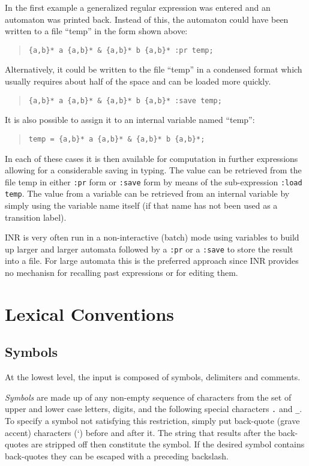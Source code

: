 In the first example a generalized regular expression was entered and an
automaton was printed back.
Instead of this, the automaton could have been written to a file ``temp''
in the form shown above:
\begin{quote}
\begin{verbatim}
{a,b}* a {a,b}* & {a,b}* b {a,b}* :pr temp;
\end{verbatim}
\end{quote}
Alternatively, it could be written to the file ``temp'' in a condensed
format which usually requires about half of the space and can be loaded more
quickly.
\begin{quote}
\begin{verbatim}
{a,b}* a {a,b}* & {a,b}* b {a,b}* :save temp;
\end{verbatim}
\end{quote}
It is also possible to assign it to an internal variable named ``temp'':
\begin{quote}
\begin{verbatim}
temp = {a,b}* a {a,b}* & {a,b}* b {a,b}*;
\end{verbatim}
\end{quote}
In each of these cases it is then available for computation in further
expressions allowing for a considerable saving in typing.
The value can be retrieved from the file temp in either {\tt :pr} form or
{\tt :save} form by means of the sub-expression {\tt :load temp}.
The value from a variable can be retrieved from an internal variable by
simply using the variable name itself (if that name has not been used as a
transition label).

INR is very often run in a non-interactive (batch) mode using variables to
build up larger and larger automata followed by a \verb#:pr# or a
\verb#:save# to store the result into a file.
For large automata this is the preferred approach since INR provides no
mechanisn for recalling past expressions or for editing them.
\section{Lexical Conventions}
\subsection{Symbols}
At the lowest level, the input is composed of symbols, delimiters and
comments.

{\em Symbols} are made up of any non-empty sequence of
characters from the set of upper and lower case letters,
digits, and the following special characters \verb#.# and \verb#_#.
To specify a symbol not satisfying this restriction, simply put back-quote
(grave accent) characters (`) before and after it.
The string that results after the back-quotes are stripped off then
constitute the symbol.
If the desired symbol contains back-quotes they can be escaped with a
preceding backslash.

